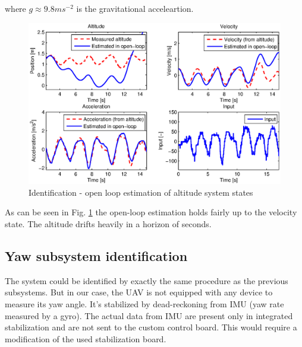 where $g \approx 9.8 ms^{-2}$ is the gravitational acceleartion.

\begin{figure}[h]
\includegraphics[width=1\textwidth]{fig/iden4.eps} 
\caption{Identification - open loop estimation of altitude system states}
\label{fig:iden4}
\end{figure}

As can be seen in Fig. \ref{fig:iden4} the open-loop estimation holds fairly up to the velocity state. The altitude drifts heavily in a horizon of seconds. 

\subsection{Yaw subsystem identification}

The system could be identified by exactly the same procedure as the previous subsystems. But in our case, the UAV is not equipped with any device to measure its yaw angle. It's stabilized by dead-reckoning from IMU (yaw rate measured by a gyro). The actual data from IMU are present only in integrated stabilization and are not sent to the custom control board. This would require a modification of the used stabilization board.
